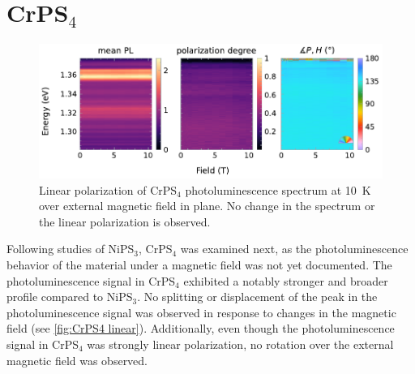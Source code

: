 \documentclass[
	twoside,
	parskip=half,
	a4paper,
]{scrbook}
\begin{document}
\clearpage
\section{CrPS$_4$}
\begin{figure}
	\centering
	\includegraphics{../figures/2024-04-09 CrPS4 linear Polarisation.pdf}
	\caption{Linear polarization of CrPS$_4$ photoluminescence spectrum at \SI{10}{K} over external magnetic field in plane. No change in the spectrum or the linear polarization is observed.}
	\label{fig:CrPS4 linear}
\end{figure}
Following studies of NiPS$_3$, CrPS$_4$ was examined next, as the photoluminescence behavior of the material under a magnetic field was not yet documented.
The photoluminescence signal in CrPS$_4$ exhibited a notably stronger and broader profile compared to NiPS$_3$.
No splitting or displacement of the peak in the photoluminescence signal was observed in response to changes in the magnetic field  (see \autoref{fig:CrPS4 linear}). 
Additionally, even though the photoluminescence signal in CrPS$_4$ was strongly linear polarization, no rotation over the external magnetic field was observed.
\end{document}
